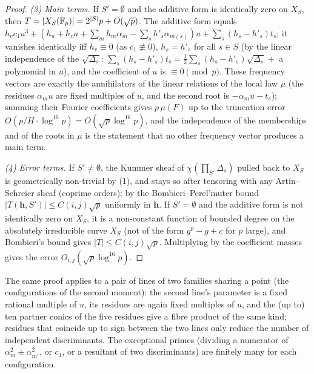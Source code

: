 \begin{proof}
\emph{(3) Main terms.}  If $S'=\emptyset$ and the additive form is identically zero on $X_S$, then $T=|X_S(\mathbb{F}_p)|=2^{|S|}p+O(\sqrt p)$.  The additive form
equals $h_vc_1u^3+(h_u+h_va+\sum_mh_m\alpha_m-\sum_sh'_s\alpha_{m(s)})u+\sum_s(h_s-h'_s)t_s$; it vanishes identically iff $h_v\equiv0$ (as $c_1\not\equiv0$),
$h_s=h'_s$ for all $s\in S$ (by the linear independence of the $\sqrt{\Delta_s}$: $\sum_s(h_s-h'_s)t_s=\tfrac12\sum_s(h_s-h'_s)\sqrt{\Delta_s}+$ a polynomial in $u$),
and the coefficient of $u$ is $\equiv0\pmod p$.  These frequency vectors are exactly the annihilators of the linear relations of the local law $\mu$
(the residues $\alpha_mu$ are fixed multiples of $u$, and the second root is $-\alpha_mu-t_s$); summing their Fourier coefficients gives $p\,\mu(F)$ up to the
truncation error $O(p/H\cdot\log^{16}p)=O(\sqrt p\log^{16}p)$, and the independence of the memberships and of the roots in $\mu$ is the statement that no other
frequency vector produces a main term.

\emph{(4) Error terms.}  If $S'\ne\emptyset$, the Kummer sheaf of $\chi(\prod_{S'}\Delta_s)$ pulled back to $X_S$ is geometrically non-trivial by (1), and stays
so after tensoring with any Artin--Schreier sheaf (coprime orders); by the Bombieri--Perel'muter bound \cite{Perelmuter,CastroMoreno} $|T(\mathbf h,S')|\le
C(i,j)\sqrt p$ uniformly in $\mathbf h$.  If $S'=\emptyset$ and the additive form is not identically zero on $X_S$, it is a non-constant function of bounded degree
on the absolutely irreducible curve $X_S$ (not of the form $g^p-g+c$ for $p$ large), and Bombieri's bound \cite{Bombieri66} gives $|T|\le C(i,j)\sqrt p$.
Multiplying by the coefficient masses gives the error $O_{i,j}(\sqrt p\log^{16}p)$.
\end{proof}
\begin{remark}
The same proof applies to a pair of lines of two families sharing a point (the configurations of the second moment): the second line's parameter is a fixed
rational multiple of $u$, its residues are again fixed multiples of $u$, and the (up to) ten partner conics of the five residues give a fibre product of the
same kind; residues that coincide up to sign between the two lines only reduce the number of independent discriminants.  The exceptional primes (dividing a
numerator of $\alpha_m^2\pm\alpha_{m'}^2$, or $c_1$, or a resultant of two discriminants) are finitely many for each configuration.
\end{remark}
